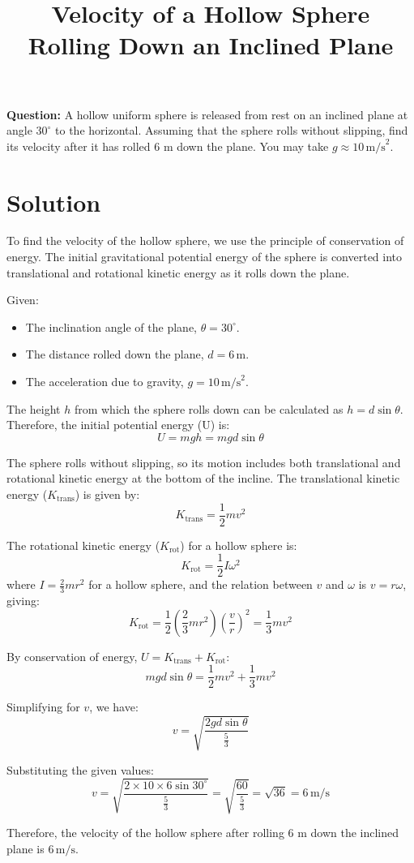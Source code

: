 \documentclass{article}
\begin{document}
\title{Velocity of a Hollow Sphere Rolling Down an Inclined Plane}
\date{}
\maketitle

\textbf{Question:} A hollow uniform sphere is released from rest on an inclined plane at angle $30^\circ$ to the horizontal. Assuming that the sphere rolls without slipping, find its velocity after it has rolled 6 m down the plane. You may take $g \approx 10\, \text{m/s}^2$.

\section*{Solution}

To find the velocity of the hollow sphere, we use the principle of conservation of energy. The initial gravitational potential energy of the sphere is converted into translational and rotational kinetic energy as it rolls down the plane.

Given:
\begin{itemize}
    \item The inclination angle of the plane, $\theta = 30^\circ$.
    \item The distance rolled down the plane, $d = 6\, \text{m}$.
    \item The acceleration due to gravity, $g = 10\, \text{m/s}^2$.
\end{itemize}

The height \(h\) from which the sphere rolls down can be calculated as $h = d \sin \theta$. Therefore, the initial potential energy (U) is:
\[ U = mgh = mgd \sin \theta \]

The sphere rolls without slipping, so its motion includes both translational and rotational kinetic energy at the bottom of the incline. The translational kinetic energy (\(K_{\text{trans}}\)) is given by:
\[ K_{\text{trans}} = \frac{1}{2}mv^2 \]

The rotational kinetic energy (\(K_{\text{rot}}\)) for a hollow sphere is:
\[ K_{\text{rot}} = \frac{1}{2}I\omega^2 \]
where \(I = \frac{2}{3}mr^2\) for a hollow sphere, and the relation between \(v\) and \(\omega\) is \(v = r\omega\), giving:
\[ K_{\text{rot}} = \frac{1}{2} \left(\frac{2}{3}mr^2\right) \left(\frac{v}{r}\right)^2 = \frac{1}{3}mv^2 \]

By conservation of energy, \(U = K_{\text{trans}} + K_{\text{rot}}\):
\[ mgd \sin \theta = \frac{1}{2}mv^2 + \frac{1}{3}mv^2 \]

Simplifying for \(v\), we have:
\[ v = \sqrt{\frac{2gd \sin \theta}{\frac{5}{3}}} \]

Substituting the given values:
\[ v = \sqrt{\frac{2 \times 10 \times 6 \sin 30^\circ}{\frac{5}{3}}} = \sqrt{\frac{60}{\frac{5}{3}}} = \sqrt{36} = 6\, \text{m/s} \]

Therefore, the velocity of the hollow sphere after rolling 6 m down the inclined plane is $6\, \text{m/s}$.
\end{document}
